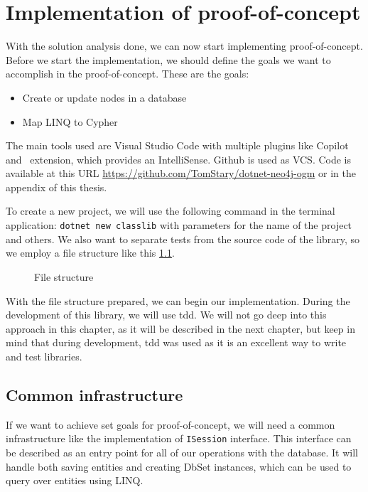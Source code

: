 \chapter {Implementation of proof-of-concept}

With the solution analysis done, we can now start implementing proof-of-concept.
Before we start the implementation, we should define the goals we want to accomplish in the proof-of-concept.
These are the goals:
\begin{itemize}
    \item {Create or update nodes in a database}
    \item {Map LINQ to Cypher}
\end{itemize}

The main tools used are Visual Studio Code with multiple plugins like Copilot and \CS\ extension, which provides an IntelliSense.
Github is used as VCS. Code is available at this URL \url{https://github.com/TomStary/dotnet-neo4j-ogm} or in the appendix of this thesis.

To create a new project, we will use the following command in the terminal application: \texttt{dotnet new classlib} with parameters for the name of the project and others.
We also want to separate tests from the source code of the library, so we employ a file structure like this \ref{ref:fileStructure}.

\begin{figure}[H]
    \caption{File structure}
    \label{ref:fileStructure}
\end{figure}

With the file structure prepared, we can begin our implementation. During the development of this
library, we will use \acrfull{tdd}. We will not go deep into this approach in this chapter,
as it will be described in the next chapter, but keep in mind that during development, \acrshort{tdd} was used as it is an excellent way to write and test libraries.

\section {Common infrastructure}

If we want to achieve set goals for proof-of-concept, we will need a common infrastructure like the implementation of \texttt{ISession} interface.
This interface can be described as an entry point for all of our operations with the database. It will handle both saving entities and creating DbSet
instances, which can be used to query over entities using LINQ.

